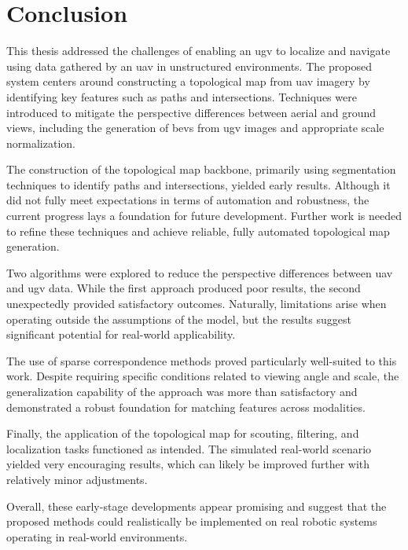 \chapter{Conclusion}\label{ch:conclusion}

%

This thesis addressed the challenges of enabling an \gls{ugv} to localize and navigate using data gathered by an \gls{uav} in unstructured environments.
The proposed system centers around constructing a topological map from \gls{uav} imagery by identifying key features such as paths and intersections.
Techniques were introduced to mitigate the perspective differences between aerial and ground views, including the generation
of \glspl{bev} from \gls{ugv} images and appropriate scale normalization.


The construction of the topological map backbone, primarily using segmentation techniques to identify paths and intersections,
yielded early results.
Although it did not fully meet expectations in terms of automation and robustness, the current progress lays a
foundation for future development.
Further work is needed to refine these techniques and achieve reliable, fully automated topological map generation.

Two algorithms were explored to reduce the perspective differences between \gls{uav} and \gls{ugv} data.
While the first approach produced poor results, the second unexpectedly provided satisfactory outcomes.
Naturally, limitations arise when operating outside the assumptions of the model, but the results suggest significant
potential for real-world applicability.

The use of sparse correspondence methods proved particularly well-suited to this work.
Despite requiring specific conditions related to viewing angle and scale, the generalization capability of the approach
was more than satisfactory and demonstrated a robust foundation for matching features across modalities.

Finally, the application of the topological map for scouting, filtering, and localization tasks functioned as intended.
The simulated real-world scenario yielded very encouraging results, which can likely be improved further with relatively minor adjustments.

Overall, these early-stage developments appear promising and suggest that the proposed methods could realistically be
implemented on real robotic systems operating in real-world environments.
